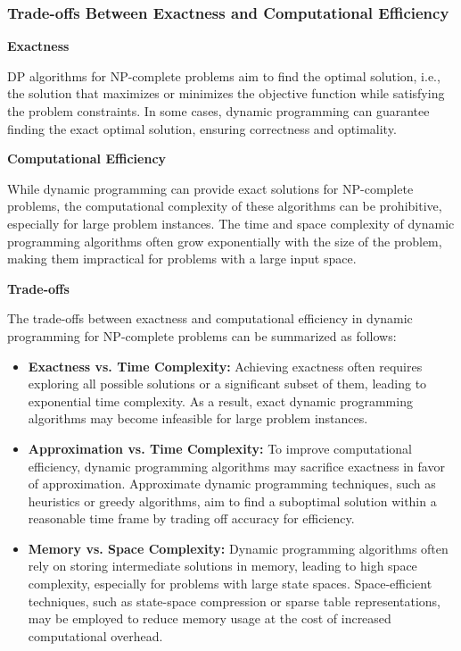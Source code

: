 \documentclass[12pt]{book} %
\begin{document}
\subsubsection{Trade-offs Between Exactness and Computational Efficiency}

\textbf{Exactness}

DP algorithms for NP-complete problems aim to find the optimal solution, i.e., the solution that maximizes or minimizes the objective function while satisfying the problem constraints. In some cases, dynamic programming can guarantee finding the exact optimal solution, ensuring correctness and optimality.

\textbf{Computational Efficiency}

While dynamic programming can provide exact solutions for NP-complete problems, the computational complexity of these algorithms can be prohibitive, especially for large problem instances. The time and space complexity of dynamic programming algorithms often grow exponentially with the size of the problem, making them impractical for problems with a large input space.

\textbf{Trade-offs}

The trade-offs between exactness and computational efficiency in dynamic programming for NP-complete problems can be summarized as follows:

\begin{itemize}
    \item \textbf{Exactness vs. Time Complexity:} Achieving exactness often requires exploring all possible solutions or a significant subset of them, leading to exponential time complexity. As a result, exact dynamic programming algorithms may become infeasible for large problem instances.
    
    \item \textbf{Approximation vs. Time Complexity:} To improve computational efficiency, dynamic programming algorithms may sacrifice exactness in favor of approximation. Approximate dynamic programming techniques, such as heuristics or greedy algorithms, aim to find a suboptimal solution within a reasonable time frame by trading off accuracy for efficiency.
    
    \item \textbf{Memory vs. Space Complexity:} Dynamic programming algorithms often rely on storing intermediate solutions in memory, leading to high space complexity, especially for problems with large state spaces. Space-efficient techniques, such as state-space compression or sparse table representations, may be employed to reduce memory usage at the cost of increased computational overhead.
\end{itemize}
\end{document}
